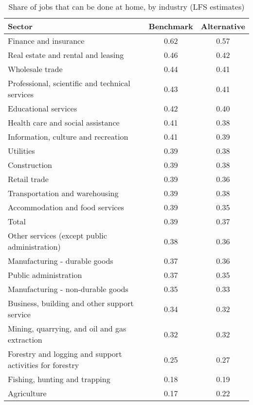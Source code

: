 \begin{table}[ht]
\centering
\caption{Share of jobs that can be done at home, by industry (LFS estimates)} 
\label{tab:industry_lfs}
\begin{tabular}{lcc}
  \hline
Sector & Benchmark & Alternative \\ 
  \hline
Finance and insurance & 0.62 & 0.57 \\ 
  Real estate and rental and leasing & 0.46 & 0.42 \\ 
  Wholesale trade & 0.44 & 0.41 \\ 
  Professional, scientific and technical services & 0.43 & 0.41 \\ 
  Educational services & 0.42 & 0.40 \\ 
  Health care and social assistance & 0.41 & 0.38 \\ 
  Information, culture and recreation & 0.41 & 0.39 \\ 
  Utilities & 0.39 & 0.38 \\ 
  Construction & 0.39 & 0.38 \\ 
  Retail trade & 0.39 & 0.36 \\ 
  Transportation and warehousing & 0.39 & 0.38 \\ 
  Accommodation and food services & 0.39 & 0.35 \\ 
  Total & 0.39 & 0.37 \\ 
  Other services (except public administration) & 0.38 & 0.36 \\ 
  Manufacturing - durable goods & 0.37 & 0.36 \\ 
  Public administration & 0.37 & 0.35 \\ 
  Manufacturing - non-durable goods & 0.35 & 0.33 \\ 
  Business, building and other support service & 0.34 & 0.32 \\ 
  Mining, quarrying, and oil and gas extraction & 0.32 & 0.32 \\ 
  Forestry and logging and support activities for forestry & 0.25 & 0.27 \\ 
  Fishing, hunting and trapping & 0.18 & 0.19 \\ 
  Agriculture & 0.17 & 0.22 \\ 
   \hline
\end{tabular}
\end{table}
